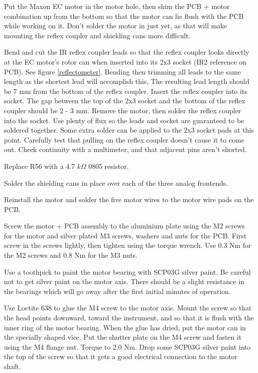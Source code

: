\documentclass{article}
\begin{document}
Put the Maxon EC motor in the motor hole,
then shim the PCB + motor combination up from the bottom so that
the motor can lie flush with the PCB while working on it.
Don't solder the motor in just yet, as that will make mounting the reflex coupler and shielding cans more difficult.

Bend and cut the IR reflex coupler leads so that the reflex coupler looks directly at the EC motor's rotor can when inserted into its 2x3 socket (IR2 reference on PCB). See figure \vref{reflectometer}.
Bending then trimming all leads to the same length as the shortest lead will accomplish this,
The resulting lead length should be 7 mm from the bottom of the reflex coupler.
Insert the reflex coupler into its socket.
The gap between the top of the 2x3 socket and the bottom of the reflex coupler should be 2 - 3 mm.
Remove the motor, then solder the reflex coupler into the socket.
Use plenty of flux so the leads and socket are guaranteed to be soldered together.
Some extra solder can be applied to the 2x3 socket pads at this point.
Carefully test that pulling on the reflex coupler doesn't cause it to come out.
Check continuity with a multimeter, and that adjacent pins aren't shorted.

Replace R56 with a 4.7 $k\Omega$ 0805 resistor.

Solder the shielding cans in place over each of the three analog frontends.

Reinstall the motor and solder the five motor wires to the motor wire pads on the PCB.

Screw the motor + PCB assembly to the aluminium plate using the M2 screws for the motor and silver plated M3 screws, washers and nuts for the PCB.
First screw in the screws lightly, then tighten using the torque wrench. Use 0.3 Nm for the M2 screws and 0.8 Nm for the M3 nuts.

Use a toothpick to paint the motor bearing with SCP03G silver paint.
Be careful not to get silver paint on the motor axis.
There should be a slight resistance in the bearings which will go away after the first initial minutes of operation.

Use Loctite 638 to glue the M4 screw to the motor axis.
Mount the screw so that the head points downward, toward the instrument,
and so that it is flush with the inner ring of the motor bearing.
When the glue has dried, put the motor can in the specially shaped vice.
Put the shutter plate on the M4 screw and fasten it using the M4 flange nut.
Torque to 2.0 Nm.
Drop some SCP03G silver paint into the top of the screw so that it gets a good electrical connection to the motor shaft.
\end{document}
